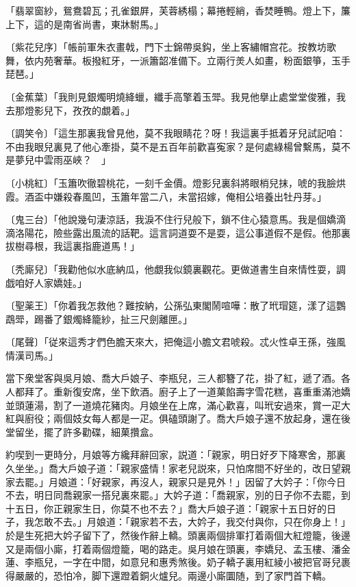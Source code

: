 \begin{myquote}
「翡翠窗紗，鴛鴦碧瓦；孔雀銀屛，芙蓉綉榻；幕捲輕綃，香焚睡鴨。燈上下，簾上下，這的是南省尚書，東牀駙馬。」

{\markfont〔紫花兒序〕}「帳前軍朱衣畫戟，門下士錦帶吳鈎，坐上客繡帽宫花。按教坊歌舞，依内苑奢華。板撥紅牙，一派簫韶准備下。立兩行羙人如畫，粉面銀箏，玉手琵琶。」

{\markfont〔金蕉葉〕}「我則見銀燭明燒絳蠟，纖手高擎着玉斝。我見他擧止處堂堂俊雅，我去那燈影兒下，孜孜的覷着。」

{\markfont〔調笑令〕}「這生那裏我曾見他，莫不我眼睛花？呀！我這裏手抵着牙兒試記咱：不由我眼兒裏見了他心牽掛，莫不是五百年前歡喜寃家？是何處綠楊曾繫馬，莫不是夢兒中雲雨巫峽？　」

{\markfont〔小桃紅〕}「玉簫吹徹碧桃花，一刻千金價。燈影兒裏斜將眼梢兒抹，唬的我臉烘霞。酒盃中嫌殺春風凹，玉簫年當二八，未當招嫁，俺相公培養出牡丹芽。」

{\markfont〔鬼三台〕}「他說幾句淒涼話，我淚不住行兒般下，鎖不住心猿意馬。我是個嬌滴滴洛陽花，險些露出風流的話靶。這言詞道耍不是耍，這公事道假不是假。他那裏拔樹尋根，我這裏指鹿道馬！」

{\markfont〔秃廝兒〕}「我勸他似水底納瓜，他覷我似鏡裏觀花。更做道書生自來情性耍，調戯咱好人家嬌娃。」

{\markfont〔聖薬王〕}「你着我怎救他？難按納，公孫弘東閣鬧喧嘩：散了玳瑁筵，漾了這鸚鵡斝，踢番了銀燭絳籠紗，扯三尺劍離匣。」

{\markfont〔尾聲〕}「従來這秀才們色膽天來大，把俺這小膽文君唬殺。忒火性卓王孫，強風情漢司馬。」
\end{myquote}

當下衆堂客與吳月娘、喬大戶娘子、李瓶兒，三人都簪了花，掛了紅，遞了酒。各人都拜了。重新復安席，坐下飲酒。廚子上了一道菓餡壽字雪花糕，喜重重滿池嬌並頭蓮湯，割了一道燒花豬肉。月娘坐在上席，滿心歡喜，叫玳安過來，賞一疋大紅與廚役；兩個妓女每人都是一疋。俱磕頭謝了。喬大戶娘子還不放起身，還在後堂留坐，擺了許多勸碟，細菓攢盒。

約喫到一更時分，月娘等方纔拜辭回家，説道：「親家，明日好歹下降寒舍，那裏久坐坐。」喬大戶娘子道：「親家盛情！家老兒説來，只怕席間不好坐的，改日望親家去罷。」月娘道：「好親家，再沒人，親家只是見外！」因留了大妗子：「你今日不去，明日同喬親家一搭兒裏來罷。」大妗子道：「喬親家，別的日子你不去罷，到十五日，你正親家生日，你莫不也不去？」喬大戶娘子道：「親家十五日好的日子，我怎敢不去。」月娘道：「親家若不去，大妗子，我交付與你，只在你身上！」於是生死把大妗子留下了，然後作辭上轎。頭裏兩個排軍打着兩個大紅燈籠，後邊又是兩個小廝，打着兩個燈籠，喝的路走。吳月娘在頭裏，李嬌兒、孟玉樓、潘金蓮、李瓶兒，一字在中間，如意兒和惠秀煞後。奶子轎子裏用紅綾小被把官哥兒裹得嚴嚴的，恐怕冷，脚下還蹬着銅火爐兒。兩邊小廝圜随，到了家門首下轎。

